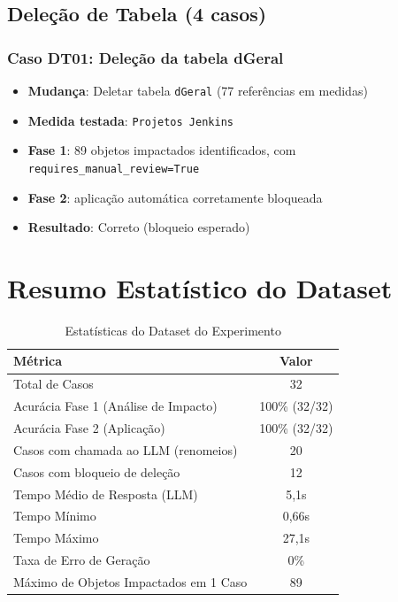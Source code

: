 \subsection{Deleção de Tabela (4 casos)}

\subsubsection{Caso DT01: Deleção da tabela dGeral}

\begin{itemize}
    \item \textbf{Mudança}: Deletar tabela \texttt{dGeral} (77 referências em medidas)
    \item \textbf{Medida testada}: \texttt{Projetos Jenkins}
    \item \textbf{Fase 1}: 89 objetos impactados identificados, com \texttt{requires\_manual\_review=True}
    \item \textbf{Fase 2}: aplicação automática corretamente bloqueada
    \item \textbf{Resultado}: Correto (bloqueio esperado)
\end{itemize}

\section{Resumo Estatístico do Dataset}

\begin{table}[H]
\centering
\caption{Estatísticas do Dataset do Experimento}
\label{tab:dataset_stats}
\begin{tabular}{lc}
\toprule
\textbf{Métrica} & \textbf{Valor} \\
\midrule
Total de Casos & 32 \\
Acurácia Fase 1 (Análise de Impacto) & 100\% (32/32) \\
Acurácia Fase 2 (Aplicação) & 100\% (32/32) \\
Casos com chamada ao LLM (renomeios) & 20 \\
Casos com bloqueio de deleção & 12 \\
Tempo Médio de Resposta (LLM) & 5,1s \\
Tempo Mínimo & 0,66s \\
Tempo Máximo & 27,1s \\
Taxa de Erro de Geração & 0\% \\
Máximo de Objetos Impactados em 1 Caso & 89 \\
\bottomrule
\end{tabular}
\end{table}

